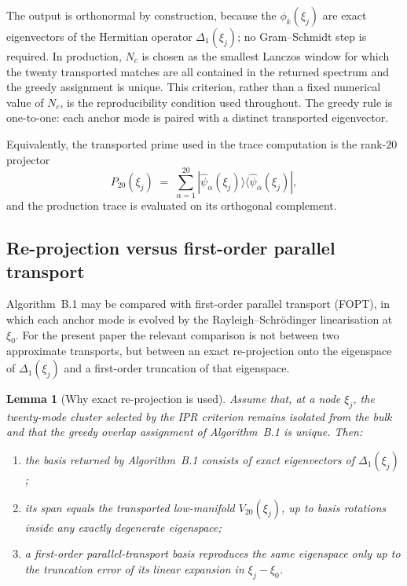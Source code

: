 \documentclass[a4paper,11pt]{article}
\newtheorem{lemma}[theorem]{Lemma}
\theoremstyle{definition}
\begin{document}
The output is orthonormal by construction, because the $\phi_k(\xi_j)$ are
exact eigenvectors of the Hermitian operator $\Delta_1(\xi_j)$; no
Gram--Schmidt step is required. In production, $N_c$ is chosen as the
smallest Lanczos window for which the twenty transported matches are all
contained in the returned spectrum and the greedy assignment is unique.
This criterion, rather than a fixed numerical value of $N_c$, is the
reproducibility condition used throughout. The greedy rule is
one-to-one: each anchor mode is paired with a distinct transported
eigenvector.

Equivalently, the transported prime used in the trace computation is the
rank-$20$ projector
\begin{equation}
P_{20}(\xi_j)
\;=\;
\sum_{\alpha=1}^{20}
|\hat\psi_\alpha(\xi_j)\rangle\!\langle\hat\psi_\alpha(\xi_j)|,
\label{eq:app-P20}
\end{equation}
and the production trace is evaluated on its orthogonal complement.

\subsection{Re-projection versus first-order parallel transport}
\label{app:transport-vs-fopt}

Algorithm~B.1 may be compared with first-order parallel transport (FOPT),
in which each anchor mode is evolved by the Rayleigh--Schr\"odinger
linearisation at $\xi_0$. For the present paper the relevant comparison
is not between two approximate transports, but between an exact
re-projection onto the eigenspace of $\Delta_1(\xi_j)$ and a first-order
truncation of that eigenspace.

\begin{lemma}[Why exact re-projection is used]
\label{lem:rep-vs-fopt}
Assume that, at a node $\xi_j$, the twenty-mode cluster selected by the
IPR criterion remains isolated from the bulk and that the greedy overlap
assignment of Algorithm~B.1 is unique. Then:
\begin{enumerate}
\item[(i)] the basis returned by Algorithm~B.1 consists of exact
eigenvectors of $\Delta_1(\xi_j)$;
\item[(ii)] its span equals the transported low-manifold $V_{20}(\xi_j)$,
up to basis rotations inside any exactly degenerate eigenspace;
\item[(iii)] a first-order parallel-transport basis reproduces the same
eigenspace only up to the truncation error of its linear expansion in
$\xi_j - \xi_0$.
\end{enumerate}
\end{lemma}
\end{document}
